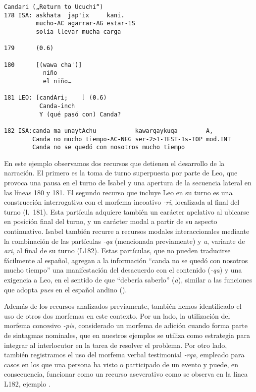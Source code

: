 \documentclass[output=paper]{../langscibook}
\begin{document}
\ea\label{ex:satti:12}
\begin{verbatim}
Candari („Return to Ucuchi“)
178 ISA: askhata  jap'ix     kani.
         mucho-AC agarrar-AG estar-1S
         solía llevar mucha carga

179      (0.6)

180      [(wawa cha')]
           niño
           el niño…

181 LEO: [candAri;    ] (0.6) 
          Canda-inch
          Y (qué pasó con) Canda?

182 ISA:canda ma unaytAchu           kawarqaykuqa        A,
        Canda no mucho tiempo-AC-NEG ser-2>1-TEST-1s-TOP mod.INT
        Canda no se quedó con nosotros mucho tiempo
\end{verbatim}
\z

En este ejemplo observamos dos recursos que detienen el desarrollo de la narración. El primero es la toma de turno superpuesta por parte de Leo, que provoca una pausa en el turno de Isabel y una apertura de la secuencia lateral en las líneas 180 y 181. El segundo recurso que incluye Leo en su turno es una construcción interrogativa con el morfema incoativo \textit{{}-ri}, localizada al final del turno (l. 181). Esta partícula adquiere también un carácter apelativo al ubicarse en posición final del turno, y un carácter modal a partir de su aspecto continuativo. Isabel también recurre a recursos modales interaccionales mediante la combinación de las partículas \textit{{}-qa} (mencionada previamente) y \textit{a}, variante de \textit{ari}, al final de su turno (L182). Estas partículas, que no pueden traducirse fácilmente al español, agregan a la información “canda no se quedó con nosotros mucho tiempo” una manifestación del desacuerdo con el contenido (\textit{{}-qa}) y una exigencia a Leo, en el sentido de que “debería saberlo” (\textit{a}), similar a las funciones que adopta \textit{pues} en el español andino (\citealt{SotoRodríguez2013}).

Además de los recursos analizados previamente, también hemos identificado el uso de otros dos morfemas en este contexto. Por un lado, la utilización del morfema concesivo \textit{{}-pis}, considerado un morfema de adición cuando forma parte de sintagmas nominales, que en nuestros ejemplos se utiliza como estrategia para integrar al interlocutor en la tarea de resolver el problema. Por otro lado, también registramos el uso del morfema verbal testimonial \textit{{}-rqa}, empleado para casos en los que una persona ha visto o participado de un evento y puede, en consecuencia, funcionar como un recurso aseverativo como se observa en la linea L182, ejemplo .
\end{document}
